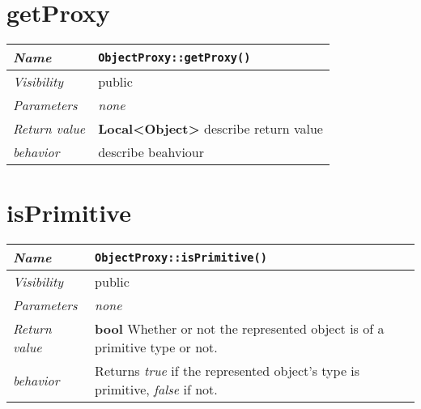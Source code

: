  \section{getProxy}
\begin{longtable}{p{3cm} @{\hskip 1cm} p{12cm}}
 \hline
\textit{Name} & \texttt{ObjectProxy::getProxy()}\\
\hline
 \textit{Visibility} & public\\
\hline
\textit{Parameters} & \textit{none}\\
\hline
\textit{Return value} & \textbf{Local<Object>} describe return value\\
  \hline
 \textit{behavior} & describe beahviour \\
\hline
\end{longtable} \pagebreak
 \section{isPrimitive}
\begin{longtable}{p{3cm} @{\hskip 1cm} p{12cm}}
 \hline
\textit{Name} & \texttt{ObjectProxy::isPrimitive()}\\
\hline
 \textit{Visibility} & public\\
\hline
\textit{Parameters} & \textit{none}\\
\hline
\textit{Return value} & \textbf{bool} Whether or not the represented object is of a primitive type or not.\\
  \hline
  \textit{behavior} & Returns \textit{true} if the represented object's type is primitive, \textit{false} if not.\\
\hline
\end{longtable} \pagebreak
